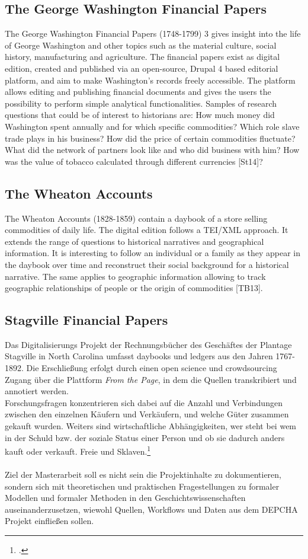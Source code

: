 \documentclass[12pt,a4paper]{article}
\begin{document}
\subsection{The George Washington Financial Papers}
The George Washington Financial Papers (1748-1799) 3 gives insight into the life of
George Washington and other topics such as the material culture, social history,
manufacturing and agriculture. The financial papers exist as digital edition, created and
published via an open-source, Drupal 4 based editorial platform, and aim to make
Washington’s records freely accessible. The platform allows editing and publishing
financial documents and gives the users the possibility to perform simple analytical
functionalities. Samples of research questions that could be of interest to historians are:
How much money did Washington spent annually and for which specific commodities?
Which role slave trade plays in his business? How did the price of certain commodities
fluctuate? What did the network of partners look like and who did business with him?
How was the value of tobacco calculated through different currencies [St14]?

\subsection{The Wheaton Accounts}
The Wheaton Accounts (1828-1859) contain a daybook of a store selling commodities of
daily life. The digital edition follows a TEI/XML approach. It extends the range of
questions to historical narratives and geographical information. It is interesting to follow
an individual or a family as they appear in the daybook over time and reconstruct their 
social background for a historical narrative. The same applies to geographic information
allowing to track geographic relationships of people or the origin of commodities [TB13].

\subsection{Stagville Financial Papers}
Das Digitalisierungs Projekt der Rechnungsbücher des Geschäftes der Plantage Stagville in North Carolina umfasst daybooks und ledgers aus den Jahren 1767-1892. Die Erschließung erfolgt durch einen open science und crowdsourcing Zugang über die Plattform \textit{From the Page}, in dem die Quellen transkribiert und annotiert werden.
\\
Forschungsfragen konzentrieren sich dabei auf die Anzahl und Verbindungen zwischen den einzelnen Käufern und Verkäufern, und welche Güter zusammen gekauft wurden. Weiters sind wirtschaftliche Abhängigkeiten, wer steht bei wem in der Schuld bzw. der soziale Status einer Person und ob sie dadurch anders kauft oder verkauft. Freie und Sklaven.\footcite{brumfield2015encoding}
\\
\\
Ziel der Masterarbeit soll es nicht sein die Projektinhalte zu dokumentieren, sondern sich mit theoretischen und praktischen Fragestellungen zu formaler Modellen und formaler Methoden in den Geschichtswissenschaften  auseinanderzusetzen, wiewohl Quellen, Workflows und Daten aus dem DEPCHA Projekt einfließen sollen.
\end{document}
